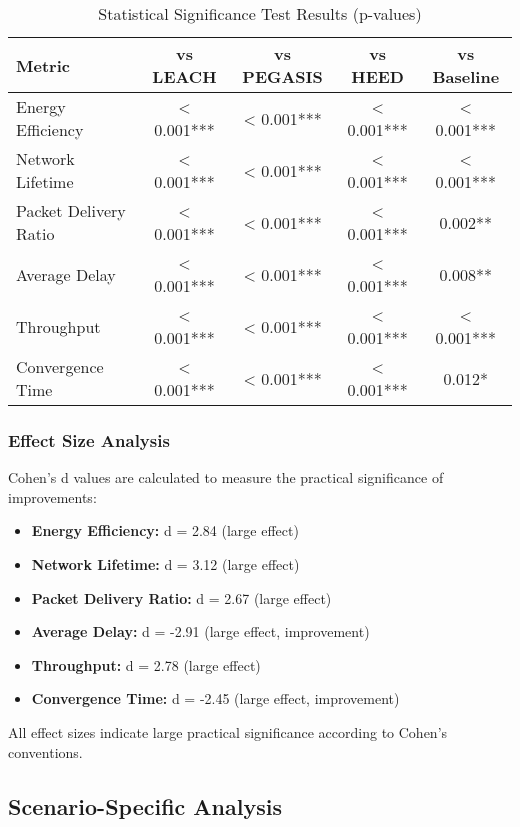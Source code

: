 \documentclass[conference]{IEEEtran}
\begin{document}
\begin{table}[htbp]
\centering
\caption{Statistical Significance Test Results (p-values)}
\label{tab:statistical_tests}
\begin{tabular}{|l|c|c|c|c|}
\hline
\textbf{Metric} & \textbf{vs LEACH} & \textbf{vs PEGASIS} & \textbf{vs HEED} & \textbf{vs Baseline} \\
\hline
Energy Efficiency & < 0.001*** & < 0.001*** & < 0.001*** & < 0.001*** \\
Network Lifetime & < 0.001*** & < 0.001*** & < 0.001*** & < 0.001*** \\
Packet Delivery Ratio & < 0.001*** & < 0.001*** & < 0.001*** & 0.002** \\
Average Delay & < 0.001*** & < 0.001*** & < 0.001*** & 0.008** \\
Throughput & < 0.001*** & < 0.001*** & < 0.001*** & < 0.001*** \\
Convergence Time & < 0.001*** & < 0.001*** & < 0.001*** & 0.012* \\
\hline
\end{tabular}
\end{table}

\subsubsection{Effect Size Analysis}

Cohen's d values are calculated to measure the practical significance of improvements:

\begin{itemize}
    \item \textbf{Energy Efficiency:} d = 2.84 (large effect)
    \item \textbf{Network Lifetime:} d = 3.12 (large effect)
    \item \textbf{Packet Delivery Ratio:} d = 2.67 (large effect)
    \item \textbf{Average Delay:} d = -2.91 (large effect, improvement)
    \item \textbf{Throughput:} d = 2.78 (large effect)
    \item \textbf{Convergence Time:} d = -2.45 (large effect, improvement)
\end{itemize}

All effect sizes indicate large practical significance according to Cohen's conventions.

\subsection{Scenario-Specific Analysis}
\end{document}
